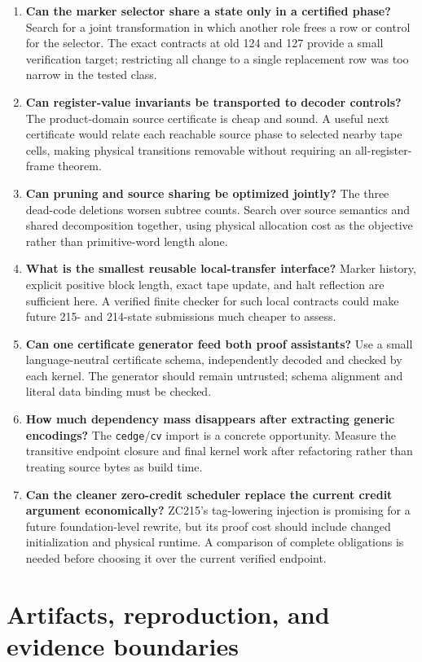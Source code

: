 \documentclass[11pt]{article}
\theoremstyle{remark}\newtheorem{remark}[theorem]{Remark}
\newcommand{\code}[1]{\texttt{\small #1}}
\begin{document}
\begin{enumerate}
\item \textbf{Can the marker selector share a state only in a certified phase?} Search for a joint transformation in which another role frees a row or control for the selector. The exact contracts at old 124 and 127 provide a small verification target; restricting all change to a single replacement row was too narrow in the tested class.
\item \textbf{Can register-value invariants be transported to decoder controls?} The product-domain source certificate is cheap and sound. A useful next certificate would relate each reachable source phase to selected nearby tape cells, making physical transitions removable without requiring an all-register-frame theorem.
\item \textbf{Can pruning and source sharing be optimized jointly?} The three dead-code deletions worsen subtree counts. Search over source semantics and shared decomposition together, using physical allocation cost as the objective rather than primitive-word length alone.
\item \textbf{What is the smallest reusable local-transfer interface?} Marker history, explicit positive block length, exact tape update, and halt reflection are sufficient here. A verified finite checker for such local contracts could make future 215- and 214-state submissions much cheaper to assess.
\item \textbf{Can one certificate generator feed both proof assistants?} Use a small language-neutral certificate schema, independently decoded and checked by each kernel. The generator should remain untrusted; schema alignment and literal data binding must be checked.
\item \textbf{How much dependency mass disappears after extracting generic encodings?} The \code{cedge}/\code{cv} import is a concrete opportunity. Measure the transitive endpoint closure and final kernel work after refactoring rather than treating source bytes as build time.
\item \textbf{Can the cleaner zero-credit scheduler replace the current credit argument economically?} ZC215's tag-lowering injection is promising for a future foundation-level rewrite, but its proof cost should include changed initialization and physical runtime. A comparison of complete obligations is needed before choosing it over the current verified endpoint.
\end{enumerate}

\section{Artifacts, reproduction, and evidence boundaries}
\end{document}
